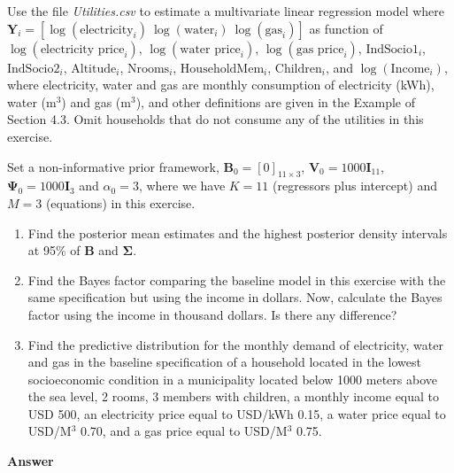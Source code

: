 \begin{enumerate}[leftmargin=*]
Use the file \textit{Utilities.csv} to estimate a multivariate linear regression model where $\mathbf{Y}_i=\left[\log(\text{electricity}_i) \ \log(\text{water}_i) \ \log(\text{gas}_i)\right]$ as function of $\log(\text{electricity price}_i)$, $\log(\text{water price}_i)$, $\log(\text{gas price}_i)$, $\text{IndSocio1}_i$, $\text{IndSocio2}_i$, $\text{Altitude}_i$, $\text{Nrooms}_i$, $\text{HouseholdMem}_i$, $\text{Children}_i$, and $\log(\text{Income}_i)$, where electricity, water and gas are monthly consumption of electricity (kWh), water (m$^3$) and gas (m$^3$), and other definitions are given in the Example of Section 4.3. Omit households that do not consume any of the utilities in this exercise. 

Set a non-informative prior framework, $\mathbf{B}_0=\left[0\right]_{11\times 3}$, $\mathbf{V}_0=1000 \mathbf{I}_{11}$, $\mathbf{\Psi}_0=1000 \mathbf{I}_{3}$ and $\alpha_0=3$, where we have $K=11$ (regressors plus intercept) and $M=3$ (equations) in this exercise.

\begin{enumerate}
	\item Find the posterior mean estimates and the highest posterior density intervals at 95\% of $\mathbf{B}$ and $\mathbf{\Sigma}$.
	\item Find the Bayes factor comparing the baseline model in this exercise with the same specification but using the income in dollars. Now, calculate the Bayes factor using the income in thousand dollars. Is there any difference?
	\item Find the predictive distribution for the monthly demand of electricity, water and gas in the baseline specification of a household located in the lowest socioeconomic condition in a municipality located below 1000 meters above the sea level, 2 rooms, 3 members with children, a monthly income equal to USD 500, an electricity price equal to USD/kWh 0.15, a water price equal to USD/M$^3$ 0.70, and a gas price equal to USD/M$^3$ 0.75. 
\end{enumerate}   

{\textbf{Answer}} 



\end{enumerate}
